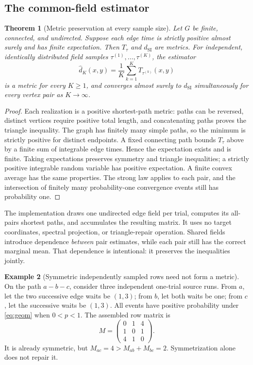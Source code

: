 \documentclass[11pt,letterpaper]{article}
\newtheorem{theorem}{Theorem}[section]
\theoremstyle{definition}
\newtheorem{example}[theorem]{Example}
\theoremstyle{remark}
\newcommand{\dSI}{d_{\mathrm{SI}}}
\newcommand{\dhat}{\widehat d_K}
\begin{document}
\subsection{The common-field estimator}
\begin{theorem}[Metric preservation at every sample size]\label{thm:metric}
Let $G$ be finite, connected, and undirected. Suppose each edge time is strictly positive almost surely and has finite expectation. Then $T_\tau$ and $\dSI$ are metrics. For independent, identically distributed field samples $\tau^{(1)},\ldots,\tau^{(K)}$, the estimator
\begin{equation}
 \dhat(x,y)=\frac1K\sum_{k=1}^K T_{\tau^{(k)}}(x,y)
 \label{eq:estimate}
\end{equation}
is a metric for every $K\geq1$, and converges almost surely to $\dSI$ simultaneously for every vertex pair as $K\to\infty$.
\end{theorem}
\begin{proof}
Each realization is a positive shortest-path metric: paths can be reversed, distinct vertices require positive total length, and concatenating paths proves the triangle inequality. The graph has finitely many simple paths, so the minimum is strictly positive for distinct endpoints. A fixed connecting path bounds $T_\tau$ above by a finite sum of integrable edge times. Hence the expectation exists and is finite. Taking expectations preserves symmetry and triangle inequalities; a strictly positive integrable random variable has positive expectation. A finite convex average has the same properties. The strong law applies to each pair, and the intersection of finitely many probability-one convergence events still has probability one.
\end{proof}

The implementation draws one undirected edge field per trial, computes its all-pairs shortest paths, and accumulates the resulting matrix. It uses no target coordinates, spectral projection, or triangle-repair operation. Shared fields introduce dependence \emph{between} pair estimates, while each pair still has the correct marginal mean. That dependence is intentional: it preserves the inequalities jointly.

\begin{example}[Symmetric independently sampled rows need not form a metric]\label{ex:rows}
On the path $a-b-c$, consider three independent one-trial source runs. From $a$, let the two successive edge waits be $(1,3)$; from $b$, let both waits be one; from $c$, let the successive waits be $(1,3)$. All events have positive probability under \eqref{eq:geom} when $0<p<1$. The assembled row matrix is
\begin{equation}
 M=\begin{pmatrix}0&1&4\\1&0&1\\4&1&0\end{pmatrix}.
\end{equation}
It is already symmetric, but $M_{ac}=4>M_{ab}+M_{bc}=2$. Symmetrization alone does not repair it.
\end{example}
\end{document}
